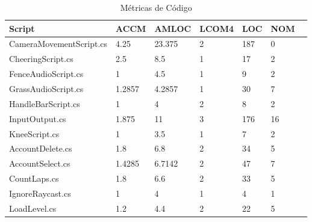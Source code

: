 \begin{table}[htp]
\centering
\caption{Métricas de Código}
\label{figura:metricas}
\begin{tabular}{lllllll}
\hline
Script & ACCM & AMLOC & LCOM4 & LOC & NOM \\
\hline
CameraMovementScript.cs & 4.25\cellcolor[HTML]{9AFF99} & 23.375\cellcolor[HTML]{FFCE93} & 2\cellcolor[HTML]{FFFC9E} & 187\cellcolor[HTML]{FFCE93} & 0\cellcolor[HTML]{9AFF99} \\
CheeringScript.cs & 2.5\cellcolor[HTML]{9AFF99} & 8.5\cellcolor[HTML]{9AFF99} & 1\cellcolor[HTML]{9AFF99} & 17\cellcolor[HTML]{9AFF99} & 2\cellcolor[HTML]{9AFF99} \\
FenceAudioScript.cs & 1\cellcolor[HTML]{9AFF99} & 4.5\cellcolor[HTML]{9AFF99} & 1\cellcolor[HTML]{9AFF99} & 9\cellcolor[HTML]{9AFF99} & 2\cellcolor[HTML]{9AFF99} \\
GrassAudioScript.cs & 1.2857\cellcolor[HTML]{9AFF99} & 4.2857\cellcolor[HTML]{9AFF99} & 1\cellcolor[HTML]{9AFF99} & 30\cellcolor[HTML]{9AFF99} & 7\cellcolor[HTML]{9AFF99} \\
HandleBarScript.cs & 1\cellcolor[HTML]{9AFF99} & 4\cellcolor[HTML]{9AFF99} & 2\cellcolor[HTML]{FFFC9E} & 8\cellcolor[HTML]{9AFF99} & 2\cellcolor[HTML]{9AFF99} \\
InputOutput.cs & 1.875\cellcolor[HTML]{9AFF99} & 11\cellcolor[HTML]{FFFC9E} & 3\cellcolor[HTML]{FFFC9E} & 176\cellcolor[HTML]{FFCE93} & 16\cellcolor[HTML]{FFFC9E} \\
KneeScript.cs & 1\cellcolor[HTML]{9AFF99} & 3.5\cellcolor[HTML]{9AFF99} & 1\cellcolor[HTML]{9AFF99} & 7\cellcolor[HTML]{9AFF99} & 2\cellcolor[HTML]{9AFF99} \\
AccountDelete.cs & 1.8\cellcolor[HTML]{9AFF99} & 6.8\cellcolor[HTML]{9AFF99} & 2\cellcolor[HTML]{FFFC9E} & 34\cellcolor[HTML]{9AFF99} & 5\cellcolor[HTML]{9AFF99} \\
AccountSelect.cs & 1.4285\cellcolor[HTML]{9AFF99} & 6.7142\cellcolor[HTML]{9AFF99} & 2\cellcolor[HTML]{FFFC9E} & 47\cellcolor[HTML]{9AFF99} & 7\cellcolor[HTML]{9AFF99} \\
CountLaps.cs & 1.8\cellcolor[HTML]{9AFF99} & 6.6\cellcolor[HTML]{9AFF99} & 2\cellcolor[HTML]{FFFC9E} & 33\cellcolor[HTML]{9AFF99} & 5\cellcolor[HTML]{9AFF99} \\
IgnoreRaycast.cs & 1\cellcolor[HTML]{9AFF99} & 4\cellcolor[HTML]{9AFF99} & 1\cellcolor[HTML]{9AFF99} & 4\cellcolor[HTML]{9AFF99} & 1\cellcolor[HTML]{9AFF99} \\
LoadLevel.cs & 1.2\cellcolor[HTML]{9AFF99} & 4.4\cellcolor[HTML]{9AFF99} & 2\cellcolor[HTML]{FFFC9E} & 22\cellcolor[HTML]{9AFF99} & 5\cellcolor[HTML]{9AFF99} \\

\end{tabular}
\end{table}
